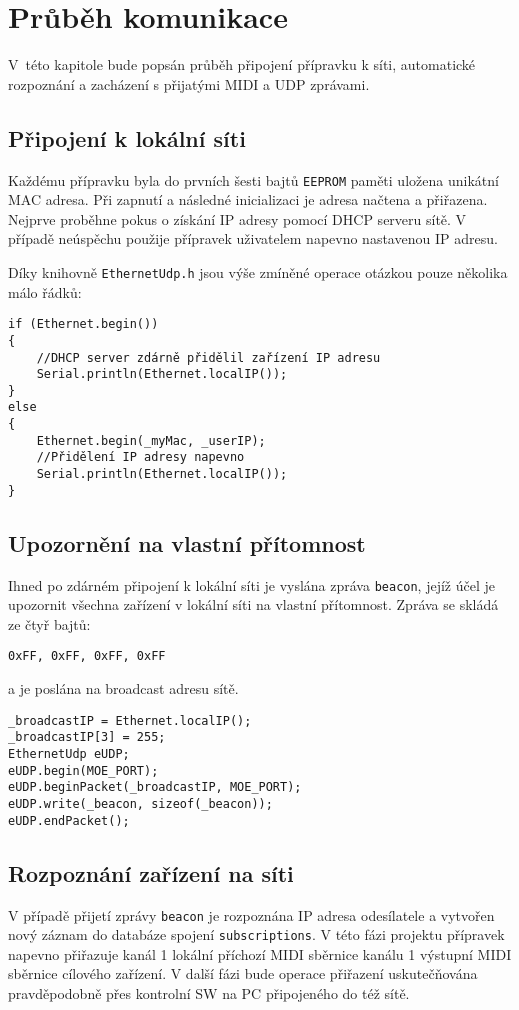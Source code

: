 \chapter{Průběh komunikace}
V~této kapitole bude popsán průběh připojení přípravku k síti, automatické rozpoznání a zacházení s přijatými \acs{MIDI} a UDP zprávami.

\section{Připojení k lokální síti}
Každému přípravku byla do prvních šesti bajtů \texttt{EEPROM} paměti uložena unikátní MAC adresa. Při zapnutí a následné inicializaci je adresa načtena a přiřazena. Nejprve proběhne pokus o získání IP adresy pomocí DHCP serveru sítě. V případě neúspěchu použije přípravek uživatelem napevno nastavenou IP adresu. 

Díky knihovně \texttt{EthernetUdp.h} jsou výše zmíněné operace otázkou pouze několika málo řádků:

\begin{lstlisting}
if (Ethernet.begin())
{
    //DHCP server zdárně přidělil zařízení IP adresu
    Serial.println(Ethernet.localIP());
}
else
{
    Ethernet.begin(_myMac, _userIP);
    //Přidělení IP adresy napevno
    Serial.println(Ethernet.localIP());
}
\end{lstlisting}


\newcommand{\bytes}[4]{
    \begin{center}
        \large{\texttt{0x#1, 0x#2, 0x#3, 0x#4}}
    \end{center}
}



\section{Upozornění na vlastní přítomnost}
Ihned po zdárném připojení k lokální síti je vyslána zpráva  \texttt{beacon}, jejíž účel je upozornit všechna zařízení v lokální síti na vlastní přítomnost. Zpráva se skládá ze čtyř bajtů:
\bytes{FF}{FF}{FF}{FF}
a je poslána na broadcast adresu sítě.

\begin{lstlisting}
_broadcastIP = Ethernet.localIP();
_broadcastIP[3] = 255;
EthernetUdp eUDP;
eUDP.begin(MOE_PORT);
eUDP.beginPacket(_broadcastIP, MOE_PORT);
eUDP.write(_beacon, sizeof(_beacon));
eUDP.endPacket();
\end{lstlisting}

\section{Rozpoznání zařízení na síti}
V případě přijetí zprávy \texttt{beacon} je rozpoznána IP adresa odesílatele a vytvořen nový záznam do databáze spojení \texttt{sub\-scrip\-tions}. V této fázi projektu přípravek napevno přiřazuje kanál 1  lokální příchozí \acs{MIDI} sběrnice kanálu 1 výstupní \acs{MIDI} sběrnice cílového zařízení. V další fázi bude operace přiřazení uskutečňována pravděpodobně přes kontrolní SW na PC připojeného do též sítě.

